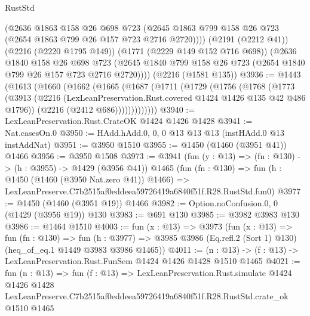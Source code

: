 \begin{lexlean}{RustStd}
\begin{coremodule}
        (@2636
          @1863
          @158
          @26
          @698
          @723
          (@2645 @1863 @799 @158 @26 @723 (@2654 @1863 @799 @26 @157 @723 @2716 @2720))))
      (@2191 (@2212 @41))
      (@2216 (@2220 @1795 @149))
      (@1771 (@2229 @149 @152 @716 @698))
      (@2636
        @1840
        @158
        @26
        @698
        @723
        (@2645 @1840 @799 @158 @26 @723 (@2654 @1840 @799 @26 @157 @723 @2716 @2720))))
    (@2216 (@1581 @135))
@3936 := @1443
    (@1613
      (@1660
        (@1662
          (@1665
            (@1687
              (@1711
                (@1729
                  (@1756
                    (@1768
                      (@1773
                        (@3913
                          (@2216 (LexLeanPreservation.Rust.covered @1424 @1426 @135 @42 @486 @1796))
                          (@2216 (@2412 @686)))))))))))))
@3940 := LexLeanPreservation.Rust.CrateOK @1424 @1426 @1428
@3941 := Nat.casesOn.{0}
@3950 := HAdd.hAdd.{0, 0, 0} @13 @13 @13 (instHAdd.{0} @13 instAddNat)
@3951 := @3950 @1510
@3955 := @1450 (@1460 (@3951 @41)) @1466
@3956 := @3950 @1508
@3973 := @3941
    (fun (y : @13) => (fn : @130) -> (h : @3955) -> @1429 (@3956 @41))
    @1465
    (fun (fn : @130) =>
    fun (h : @1450 (@1460 (@3950 Nat.zero @41)) @1466) =>
    LexLeanPreserve.C7b2515af0eddeea59726419a6840f51f.R28.RustStd.fun0)
@3977 := @1450 (@1460 (@3951 @19)) @1466
@3982 := Option.noConfusion.{0, 0} (@1429 (@3956 @19)) @130
@3983 := @691 @130
@3985 := @3982 @3983 @130
@3986 := @1464 @1510
@4003 := fun (x : @13) =>
  @3973
    (fun (x : @13) =>
    fun (fn : @130) =>
    fun (h : @3977) =>
    @3985 @3986 (Eq.refl.{2} (Sort 1) @130) (heq_of_eq.{1} @1449 @3983 @3986 @1465))
@4011 := (n : @13) -> (f : @13) -> LexLeanPreservation.Rust.FunSem @1424 @1426 @1428 @1510 @1465
@4021 := fun (n : @13) =>
  fun (f : @13) =>
  LexLeanPreservation.Rust.simulate
    @1424
    @1426
    @1428
    LexLeanPreserve.C7b2515af0eddeea59726419a6840f51f.R28.RustStd.crate_ok
    @1510
    @1465
\end{coremodule}
\end{lexlean}
